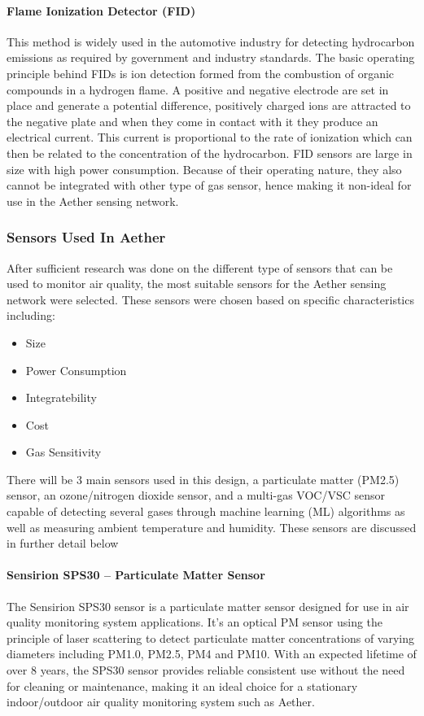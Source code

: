 \paragraph{Flame Ionization Detector (FID)}
This method is widely used in the automotive industry for detecting hydrocarbon emissions as required by government and industry standards. The basic operating principle behind FIDs is ion detection formed from the combustion of organic compounds in a hydrogen flame. A positive and negative electrode are set in place and generate a potential difference, positively charged ions are attracted to the negative plate and when they come in contact with it they produce an electrical current. This current is proportional to the rate of ionization which can then be related to the concentration of the hydrocarbon. FID sensors are large in size with high power consumption. Because of their operating nature, they also cannot be integrated with other type of gas sensor, hence making it non-ideal for use in the Aether sensing network.

\subsubsection{Sensors Used In Aether}
After sufficient research was done on the different type of sensors that can be used to monitor air quality, the most suitable sensors for the Aether sensing network were selected. These sensors were chosen based on specific characteristics including:

\begin{itemize}
\item Size
\item Power Consumption
\item Integratebility
\item Cost
\item Gas Sensitivity
\end{itemize}

There will be 3 main sensors used in this design, a particulate matter (PM2.5) sensor, an ozone/nitrogen dioxide sensor, and a multi-gas VOC/VSC sensor capable of detecting several gases through machine learning (ML) algorithms as well as measuring ambient temperature and humidity. These sensors are discussed in further detail below
\paragraph{Sensirion SPS30 – Particulate Matter Sensor}
The Sensirion SPS30 sensor is a particulate matter sensor designed for use in air quality monitoring system applications. It’s an optical PM sensor using the principle of laser scattering to detect particulate matter concentrations of varying diameters including PM1.0, PM2.5, PM4 and PM10. With an expected lifetime of over 8 years, the SPS30 sensor provides reliable consistent use without the need for cleaning or maintenance, making it an ideal choice for a stationary indoor/outdoor air quality monitoring system such as Aether.

